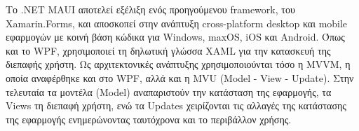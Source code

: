 Το .NET MAUI αποτελεί εξέλιξη ενός προηγούμενου framework, του Xamarin.Forms, και αποσκοπεί στην ανάπτυξη
cross-platform desktop και mobile εφαρμογών με κοινή βάση κώδικα για Windows, maxOS, iOS και Android.
Όπως και το WPF, χρησιμοποιεί τη δηλωτική γλώσσα XAML για την κατασκευή της διεπαφής χρήστη. Ως 
αρχιτεκτονικές ανάπτυξης χρησιμοποιούνται τόσο η MVVM, η οποία αναφέρθηκε και στο WPF, αλλά και η MVU
(Model - View - Update). Στην τελευταία τα μοντέλα (Model) αναπαριστούν την κατάσταση της εφαρμογής,
τα Views τη διεπαφή χρήστη, ενώ τα Updates χειρίζονται τις αλλαγές της κατάστασης της εφαρμογής 
ενημερώνοντας ταυτόχρονα και το περιβάλλον χρήσης.